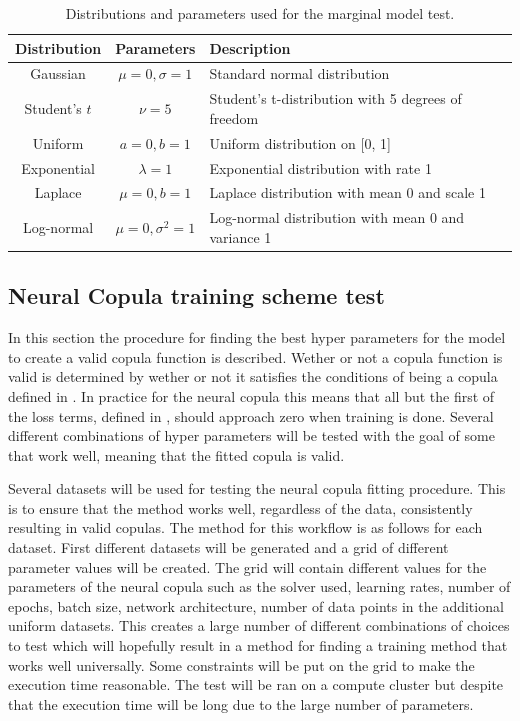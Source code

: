 \begin{table}[h]
    \centering
    \caption{Distributions and parameters used for the marginal model test.}
    \begin{tabular}{@{}ccl@{}}
        Distribution & Parameters & Description \\
        \toprule
        Gaussian & $\mu=0, \sigma=1$ & Standard normal distribution \\ 
        Student's $t$ & $\nu=5$ & Student's t-distribution with 5 degrees of freedom \\ 
        Uniform & $a=0, b=1$ & Uniform distribution on [0, 1] \\ 
        Exponential & $\lambda=1$ & Exponential distribution with rate 1 \\ 
        Laplace & $\mu=0, b=1$ & Laplace distribution with mean 0 and scale 1 \\ 
        Log-normal & $\mu=0, \sigma^2=1$ & Log-normal distribution with mean 0 and variance 1 \\ 
    \end{tabular}
    \label{tab:distributions}
\end{table}



\subsection{Neural Copula training scheme test}
In this section the procedure for finding the best hyper parameters for the model to create a valid copula function is described. Wether or not a copula function is valid is determined by wether or not it satisfies the conditions of being a copula defined in . In practice for the neural copula this means that all but the first of the loss terms, defined in , should approach zero when training is done. Several different combinations of hyper parameters will be tested with the goal of some that work well, meaning that the fitted copula is valid.

Several datasets will be used for testing the neural copula fitting procedure. This is to ensure that the method works well, regardless of the data, consistently resulting in valid copulas. The method for this workflow is as follows for each dataset. First different datasets will be generated  and a grid of different parameter values will be created. The grid will contain different values for the parameters of the neural copula such as the solver used, learning rates, number of epochs, batch size, network architecture, number of data points in the additional uniform datasets. This creates a large number of different combinations of choices to test which will hopefully result in a method for finding a training method that works well universally. Some constraints will be put on the grid to make the execution time reasonable. The test will be ran on a compute cluster but despite that the execution time will be long due to the large number of parameters. 

